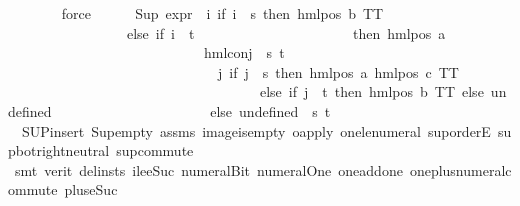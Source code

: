 \begin{isabellebody}
\ \ \ \ \ \ \isamarkupfalse%
\ force{\isacharplus}{\kern0pt}\isanewline
\ \ \ \ \isamarkupfalse%
\ {\isachardoublequoteopen}Sup\ {\isacharparenleft}{\kern0pt}{\isacharparenleft}{\kern0pt}expr{\isacharunderscore}{\kern0pt}{}\ {\isasymcirc}\ {\isacharparenleft}{\kern0pt}{\isasymlambda}i{\isachardot}{\kern0pt}\ if\ i\ {\isacharequal}{\kern0pt}\ s\ then\ hml{\isacharunderscore}{\kern0pt}pos\ b\ TT\isanewline
\ \ \ \ \ \ \ \ \ \ \ \ \ \ \ \ \ else\ if\ i\ {\isacharequal}{\kern0pt}\ t\isanewline
\ \ \ \ \ \ \ \ \ \ \ \ \ \ \ \ \ \ \ \ \ \ then\ hml{\isacharunderscore}{\kern0pt}pos\ a\isanewline
\ \ \ \ \ \ \ \ \ \ \ \ \ \ \ \ \ \ \ \ \ \ \ \ \ \ \ \ {\isacharparenleft}{\kern0pt}hml{\isacharunderscore}{\kern0pt}conj\ {\isacharbraceleft}{\kern0pt}{\isacharbraceright}{\kern0pt}\ {\isacharbraceleft}{\kern0pt}s{\isacharcomma}{\kern0pt}\ t{\isacharbraceright}{\kern0pt}\isanewline
\ \ \ \ \ \ \ \ \ \ \ \ \ \ \ \ \ \ \ \ \ \ \ \ \ \ \ \ \ \ {\isacharparenleft}{\kern0pt}{\isasymlambda}j{\isachardot}{\kern0pt}\ if\ j\ {\isacharequal}{\kern0pt}\ s\ then\ hml{\isacharunderscore}{\kern0pt}pos\ a\ {\isacharparenleft}{\kern0pt}hml{\isacharunderscore}{\kern0pt}pos\ c\ TT{\isacharparenright}{\kern0pt}\isanewline
\ \ \ \ \ \ \ \ \ \ \ \ \ \ \ \ \ \ \ \ \ \ \ \ \ \ \ \ \ \ \ \ \ \ \ \ else\ if\ j\ {\isacharequal}{\kern0pt}\ t\ then\ hml{\isacharunderscore}{\kern0pt}pos\ b\ TT\ else\ undefined{\isacharparenright}{\kern0pt}{\isacharparenright}{\kern0pt}\isanewline
\ \ \ \ \ \ \ \ \ \ \ \ \ \ \ \ \ \ \ \ \ \ else\ undefined{\isacharparenright}{\kern0pt}{\isacharparenright}{\kern0pt}\ {\isacharbackquote}{\kern0pt}\ {\isacharbraceleft}{\kern0pt}s{\isacharcomma}{\kern0pt}\ t{\isacharbraceright}{\kern0pt}{\isacharparenright}{\kern0pt}\ {\isacharequal}{\kern0pt}\ {}{\isachardoublequoteclose}\isanewline
\ \ \ \ \ \ \isamarkupfalse%
\ {\isachardoublequoteopen}{}{\isachardoublequoteclose}\ SUP{\isacharunderscore}{\kern0pt}insert\ Sup{\isacharunderscore}{\kern0pt}empty\ assms{\isacharparenleft}{\kern0pt}{}{\isacharparenright}{\kern0pt}\ image{\isacharunderscore}{\kern0pt}is{\isacharunderscore}{\kern0pt}empty\ o{\isacharunderscore}{\kern0pt}apply\ one{\isacharunderscore}{\kern0pt}le{\isacharunderscore}{\kern0pt}numeral\ sup{\isachardot}{\kern0pt}orderE\ sup{\isacharunderscore}{\kern0pt}bot{\isachardot}{\kern0pt}right{\isacharunderscore}{\kern0pt}neutral\ sup{\isacharunderscore}{\kern0pt}commute\isanewline
\ \ \ \ \ \ \isamarkupfalse%
\ {\isacharparenleft}{\kern0pt}smt\ {\isacharparenleft}{\kern0pt}verit{\isacharcomma}{\kern0pt}\ del{\isacharunderscore}{\kern0pt}insts{\isacharparenright}{\kern0pt}\ ile{\isacharunderscore}{\kern0pt}eSuc\ numeral{\isacharunderscore}{\kern0pt}Bit{}\ numeral{\isacharunderscore}{\kern0pt}One\ one{\isacharunderscore}{\kern0pt}add{\isacharunderscore}{\kern0pt}one\ one{\isacharunderscore}{\kern0pt}plus{\isacharunderscore}{\kern0pt}numeral{\isacharunderscore}{\kern0pt}commute\ plus{\isacharunderscore}{\kern0pt}{}{\isacharunderscore}{\kern0pt}eSuc{\isacharparenleft}{\kern0pt}{}{\isacharparenright}{\kern0pt}{\isacharparenright}{\kern0pt}\isanewline

\end{isabellebody}
